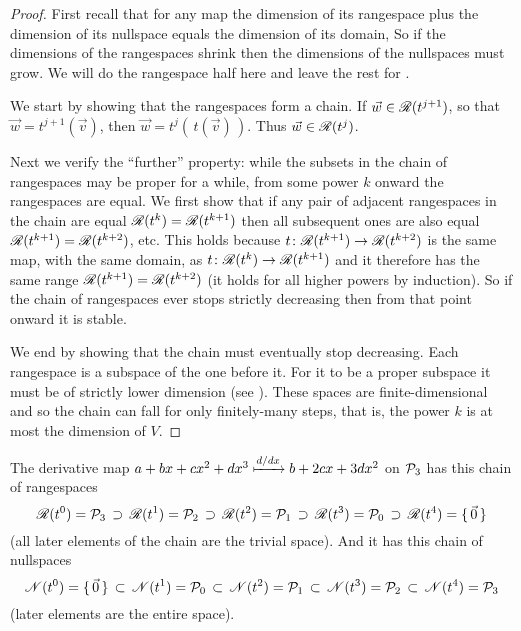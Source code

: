 \begin{proof}
First recall that for any map the dimension of its rangespace
plus the dimension of its nullspace equals
the dimension of its domain,
So if the dimensions of the rangespaces shrink then the 
dimensions of the nullspaces must grow.
We will do the rangespace half here and leave the rest for
.

We start by showing 
that the rangespaces form a chain.
If $\vec{w}\in\mathscr{R}(t^{j+1})$, so that
$\vec{w}=t^{j+1}(\vec{v})$, 
then $\vec{w}=t^{j}(\,t(\vec{v})\,)$.
Thus $\vec{w}\in\mathscr{R}(t^{j})$.

Next we verify the ``further'' property:
while the subsets in the chain of rangespaces may be proper 
for a while, from some power $k$ onward the rangespaces are equal. 
We first show that if any pair of adjacent rangespaces in the
chain are equal \( \mathscr{R}(t^{k})=\mathscr{R}(t^{k+1}) \)
then all subsequent ones are also equal
\( \mathscr{R}(t^{k+1})=\mathscr{R}(t^{k+2}) \), etc.
This holds because
\( \mbox{$t\colon \mathscr{R}(t^{k+1})\to \mathscr{R}(t^{k+2})$} \)
is the same map, with the same domain, as
\( \mbox{$t\colon \mathscr{R}(t^{k})\to \mathscr{R}(t^{k+1})$} \) and
it therefore has the same range
\( \mathscr{R}(t^{k+1})=\mathscr{R}(t^{k+2}) \)
(it holds for all higher powers by induction).
So if the chain of rangespaces ever stops strictly decreasing then
from that point onward it is stable.

We end by showing that the chain must eventually stop decreasing. 
Each rangespace is a subspace of the one before it.
For it to be a proper subspace it must be of strictly lower dimension
(see ).
These spaces are finite-dimensional and so the chain can fall for only
finitely-many steps,
that is, the power $k$ is at most the dimension of $V$.
\end{proof}

\begin{example}
The derivative map $a+bx+cx^2+dx^3\xmapsto{d/dx} b+2cx+3dx^2$
on $\mathcal{P}_3$ has this chain of rangespaces
\begin{equation*}
  \mathscr{R}(t^0)=\mathcal{P}_3
    \,\supset\,\mathscr{R}(t^1)=\mathcal{P}_2
    \,\supset\,\mathscr{R}(t^2)=\mathcal{P}_1
    \,\supset\,\mathscr{R}(t^3)=\mathcal{P}_0
    \,\supset\,\mathscr{R}(t^4)=\mbox{$\{\,\vec{0}\,\}$}
\end{equation*}
(all later elements of the chain are the trivial space). 
And it has this chain of nullspaces
\begin{equation*}
  \mathscr{N}(t^0)=\mbox{$\{\,\vec{0}\,\}$}
  \,\subset\, \mathscr{N}(t^1)=\mathcal{P}_0
  \,\subset\,\mathscr{N}(t^2)=\mathcal{P}_1
  \,\subset\,\mathscr{N}(t^3)=\mathcal{P}_2
  \,\subset\,\mathscr{N}(t^4)=\mathcal{P}_3
\end{equation*}
(later elements are the entire space).
\end{example}

